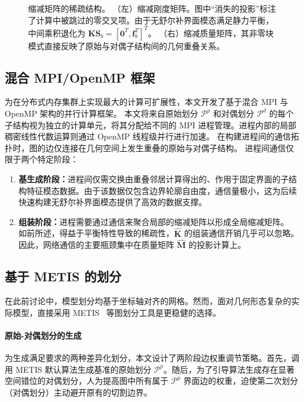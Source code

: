\begin{figure}[htbp]
  \centering
  \tiny
  \color{black}{
  
  }
  \caption[缩减矩阵的稀疏结构]{缩减矩阵的稀疏结构。
    （左）缩减刚度矩阵。图中“消失的投影”标注了计算中被跳过的零交叉项。由于无舒尔补界面模态满足静力平衡，中间乘积退化为 $\mathbf{K} \mathbf{S}_b = [\mathbf{0}^T, \mathbf{f}_b^T]^T$。
    （右）缩减质量矩阵，其非零块模式直接反映了原始与对偶子结构间的几何重叠关系。}
  \label{fig:reduced-matrix-structure}
\end{figure}

\subsection{混合 MPI/OpenMP 框架}

为在分布式内存集群上实现最大的计算可扩展性，本文开发了基于混合 MPI 与 OpenMP 架构的并行计算框架。
本文将来自原始划分 $\mathcal{P}^p$ 和对偶划分 $\mathcal{P}^d$ 的每个子结构视为独立的计算单元，将其分配给不同的 MPI 进程管理。进程内部的局部稠密线性代数运算则通过 OpenMP 线程级并行进行加速。
在构建进程间的通信拓扑时，图的边仅连接在几何空间上发生重叠的原始与对偶子结构。
进程间通信仅限于两个特定阶段：
\begin{enumerate}
    \item \textbf{基生成阶段：}进程间仅需交换由重叠邻居计算得出的、作用于固定界面的子结构特征模态数据。由于该数据仅包含边界轮廓自由度，通信量极小，这为后续快速构建无舒尔补界面模态提供了高效的数据支撑。
    \item \textbf{组装阶段：}进程需要通过通信来聚合局部的缩减矩阵以形成全局缩减矩阵。
    如前所述，得益于平衡特性导致的稀疏性，$\hat{\mathbf{K}}$ 的组装通信开销几乎可以忽略。
    因此，网络通信的主要瓶颈集中在质量矩阵 $\hat{\mathbf{M}}$ 的投影计算上。
\end{enumerate}

\subsection{基于 METIS 的划分}\label{sec:metis-partition}

在此前讨论中，模型划分均基于坐标轴对齐的网格。然而，面对几何形态复杂的实际模型，直接采用 METIS~\cite{Karypis1997METIS} 等图划分工具是更稳健的选择。

\paragraph{原始-对偶划分的生成}
为生成满足要求的两种差异化划分，本文设计了两阶段边权重调节策略。首先，调用 METIS 默认算法生成基准的原始划分 $\mathcal{P}^p$。随后，为了引导算法生成存在显著空间错位的对偶划分，人为提高图中所有属于 $\mathcal{P}^p$ 界面边的权重，迫使第二次划分（对偶划分）主动避开原有的切割边界。

